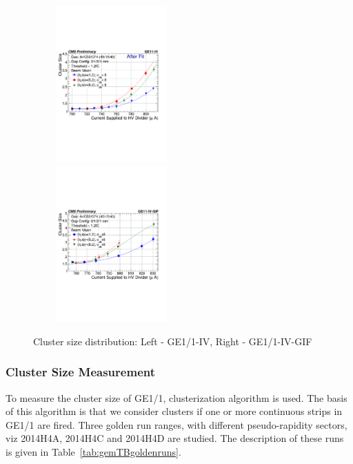 \begin{figure}[!htbp]
   \begin{center}
     \includegraphics[width=6cm,height=6cm]{figures/GEM/CurrentvsClusterSizeAll3EtaPhi.pdf}%
     \includegraphics[width=6cm,height=6cm]{figures/GEM/CurrentvsClusterSizeAll3EtaPhiGE11IVGIF.pdf}
   \end{center}
   \caption{Cluster size distribution: Left - GE1/1-IV, Right - GE1/1-IV-GIF}
   \label{fig:CSDGE1/1}
\end{figure}


\subsubsection{Cluster Size Measurement}
To measure the cluster size of GE1/1, clusterization algorithm is used.
The basis of this algorithm is that we consider clusters if one or more continuous strips in GE1/1 are fired.
Three golden run ranges, with different pseudo-rapidity sectors, viz 2014H4A, 2014H4C and 2014H4D are studied.
The description of these runs is given in Table~\ref{tab:gemTBgoldenruns}.


